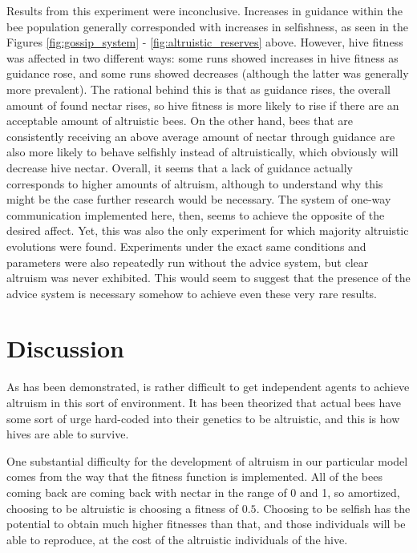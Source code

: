 \documentclass[twoside]{article}
\begin{document}
\begin{multicols}{2}
            Results from this experiment were inconclusive. Increases in guidance within the bee population generally corresponded with increases in selfishness, as seen in the Figures \ref{fig:gossip_system} - \ref{fig:altruistic_reserves} above.  However, hive fitness was affected in two different ways: some runs showed increases in hive fitness as guidance rose, and some runs showed decreases (although the latter was generally more prevalent). The rational behind this is that as guidance rises, the overall amount of found nectar rises, so hive fitness is more likely to rise if there are an acceptable amount of altruistic bees. On the other hand, bees that are consistently receiving an above average amount of nectar through guidance are also more likely to behave selfishly instead of altruistically, which obviously will decrease hive nectar. Overall, it seems that a lack of guidance actually corresponds to higher amounts of altruism, although to understand why this might be the case further research would be necessary. The system of one-way communication implemented here, then, seems to achieve the opposite of the desired affect. Yet, this was also the only experiment for which majority altruistic evolutions were found. Experiments under the exact same conditions and parameters were also repeatedly run without the advice system, but clear altruism was never exhibited. This would seem to suggest that the presence of the advice system is necessary somehow to achieve even these very rare results.


	\section{Discussion} %
	\label{sec:discussion}

		As has been demonstrated, is rather difficult to get independent agents to achieve altruism in this sort of environment. It has been theorized that actual bees have some sort of urge hard-coded into their genetics to be altruistic, and this is how hives are able to survive. \cite{macy}

		One substantial difficulty for the development of altruism in our particular model comes from the way that the fitness function is implemented. All of the bees coming back are coming back with nectar in the range of 0 and 1, so amortized, choosing to be altruistic is choosing a fitness of $0.5$. Choosing to be selfish has the potential to obtain much higher fitnesses than that, and those individuals will be able to reproduce, at the cost of the altruistic individuals of the hive.


\end{multicols}
\end{document}
